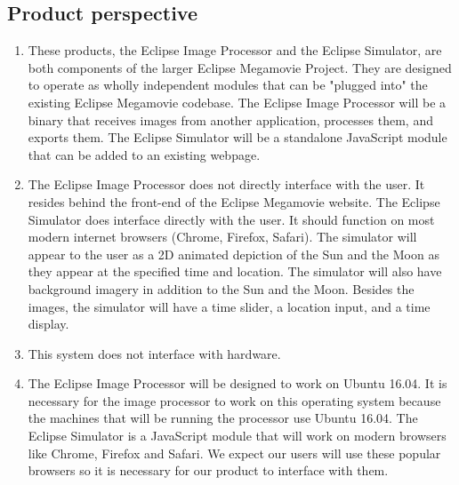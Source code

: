 \documentclass[10pt, onecolumn, draftclsnofoot, letterpaper, compsoc]{IEEEtran}
\begin{document}
\subsection{Product perspective}
	\begin{enumerate}
		\item These products, the Eclipse Image Processor and the 
		Eclipse Simulator, are both components of the larger Eclipse 
		Megamovie Project. They are designed to operate as wholly 
		independent modules that can be "plugged into" the existing 
		Eclipse Megamovie codebase. The Eclipse Image Processor will be
		a binary that receives images from another application, 
		processes them, and exports them. The Eclipse Simulator will 
		be a standalone JavaScript module that can be added to an 
		existing webpage.

		\item The Eclipse Image Processor does not directly interface
		with the user. It resides behind the front-end of the Eclipse
		Megamovie website. The Eclipse Simulator does interface 
		directly with the user. It should function on most modern 
		internet browsers (Chrome, Firefox, Safari). The simulator 
		will appear to the user as a 2D animated depiction of the 
		Sun and the Moon as they appear at the specified time and 
		location. The simulator will also have background imagery in
		addition to the Sun and the Moon. Besides the images, the
		simulator will have a time slider, a location input, and a
		time display.

		\item This system does not interface with hardware.

		\item The Eclipse Image Processor will be designed to work on
		Ubuntu 16.04. It is necessary for the image processor to 
		work on this operating system because the machines that will
		be running the processor use Ubuntu 16.04. The Eclipse 
		Simulator is a JavaScript module that will work on modern 
		browsers like Chrome, Firefox and Safari. We expect our 
		users will use these popular browsers so it is necessary 
		for our product to interface with them.      
	\end{enumerate}
\end{document}
